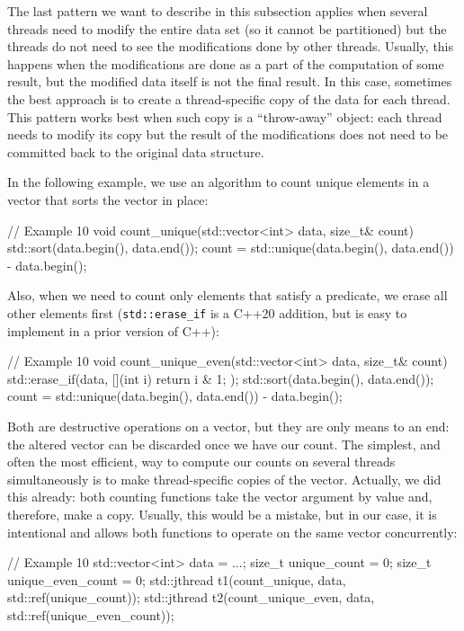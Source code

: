 The last pattern we want to describe in this subsection applies when several threads need to modify the entire data set (so it cannot be partitioned) but the threads do not need to see the modifications done by other threads. Usually, this happens when the modifications are done as a part of the computation of some result, but the modified data itself is not the final result. In this case, sometimes the best approach is to create a thread-specific copy of the data for each thread. This pattern works best when such copy is a ``throw-away'' object: each thread needs to modify its copy but the result of the modifications does not need to be committed back to the original data structure.

In the following example, we use an algorithm to count unique elements in a vector that sorts the vector in place:

\begin{code}
// Example 10
void count_unique(std::vector<int> data, size_t& count) {
  std::sort(data.begin(), data.end());
  count = std::unique(data.begin(),
                      data.end()) - data.begin();
}
\end{code}

Also, when we need to count only elements that satisfy a predicate, we erase all other elements first (\texttt{std::erase\_if} is a C++20 addition, but is easy to implement in a prior version of C++):

\begin{code}
// Example 10
void count_unique_even(std::vector<int> data, size_t& count) {
  std::erase_if(data, [](int i) { return i & 1; });
  std::sort(data.begin(), data.end());
  count = std::unique(data.begin(),
                      data.end()) - data.begin();
}
\end{code}

Both are destructive operations on a vector, but they are only means to an end: the altered vector can be discarded once we have our count. The simplest, and often the most efficient, way to compute our counts on several threads simultaneously is to make thread-specific copies of the vector. Actually, we did this already: both counting functions take the vector argument by value and, therefore, make a copy. Usually, this would be a mistake, but in our case, it is intentional and allows both functions to operate on the same vector concurrently:

\begin{code}
// Example 10
std::vector<int> data = ...;
size_t unique_count = 0;
size_t unique_even_count = 0;
{
  std::jthread t1(count_unique, data,
                  std::ref(unique_count));
  std::jthread t2(count_unique_even, data,
                  std::ref(unique_even_count));
}
\end{code}

